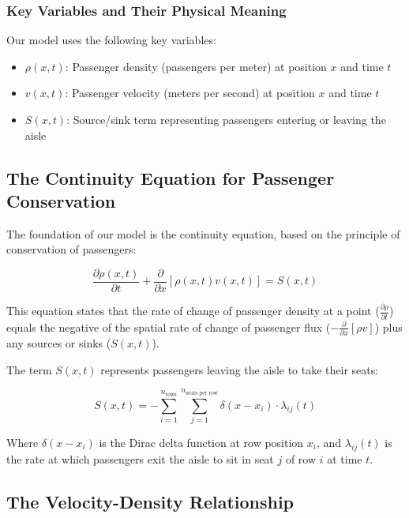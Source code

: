 \documentclass[a4paper,12pt]{article}
\begin{document}
\subsubsection{Key Variables and Their Physical Meaning}

Our model uses the following key variables:

\begin{itemize}
    \item $\rho(x,t)$: Passenger density (passengers per meter) at position $x$ and time $t$
    \item $v(x,t)$: Passenger velocity (meters per second) at position $x$ and time $t$
    \item $S(x,t)$: Source/sink term representing passengers entering or leaving the aisle
\end{itemize}

\subsection{The Continuity Equation for Passenger Conservation}

The foundation of our model is the continuity equation, based on the principle of conservation of passengers:

\begin{equation}
\frac{\partial \rho(x,t)}{\partial t} + \frac{\partial}{\partial x}[\rho(x,t)v(x,t)] = S(x,t)
\end{equation}

This equation states that the rate of change of passenger density at a point ($\frac{\partial \rho}{\partial t}$) equals the negative of the spatial rate of change of passenger flux ($-\frac{\partial}{\partial x}[\rho v]$) plus any sources or sinks ($S(x,t)$).

The term $S(x,t)$ represents passengers leaving the aisle to take their seats:

\begin{equation}
S(x,t) = -\sum_{i=1}^{n_{\text{rows}}} \sum_{j=1}^{n_{\text{seats per row}}} \delta(x - x_i) \cdot \lambda_{ij}(t)
\end{equation}

Where $\delta(x - x_i)$ is the Dirac delta function at row position $x_i$, and $\lambda_{ij}(t)$ is the rate at which passengers exit the aisle to sit in seat $j$ of row $i$ at time $t$.

\subsection{The Velocity-Density Relationship}
\end{document}
